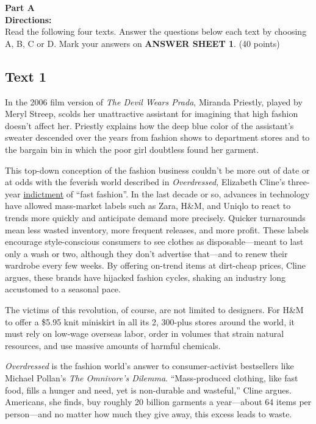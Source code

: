 \noindent
\textbf{Part A}\\
\textbf{Directions:}\\
Read the following four texts. Answer the questions below each
	text by choosing A, B, C or
	D. Mark your answers on \textbf{ANSWER SHEET 1}. (40
	points)

\newpage
\subsection{Text 1}


In the 2006 film version of \emph{The Devil Wears Prada}, Miranda
Priestly, played by Meryl Streep, scolds her unattractive assistant for
imagining that high fashion doesn't affect her. Priestly explains how
the deep blue color of the assistant's sweater descended over the years
from fashion shows to department stores and to the bargain bin in which
the poor girl doubtless found her garment.

This top-down conception of the fashion business couldn't be more out of
date or at odds with the feverish world described
in \emph{Overdressed,} Elizabeth Cline's
three-year \uline{indictment} of ``fast fashion''. In the last
decade or so, advances in technology have allowed mass-market labels
such as Zara, H\&M, and Uniqlo to react to trends more quickly and
anticipate demand more precisely. Quicker turnarounds mean less wasted
inventory, more frequent releases, and more profit. These labels
encourage style-conscious consumers to see clothes as disposable---meant
to last only a wash or two, although they don't advertise that---and to
renew their wardrobe every few weeks. By offering on-trend items at
dirt-cheap prices, Cline argues, these brands have hijacked fashion
cycles, shaking an industry long accustomed to a seasonal pace.

The victims of this revolution, of course, are not limited to designers.
For H\&M to offer a \$5.95 knit miniskirt in all its 2, 300-plus stores
around the world, it must rely on low-wage overseas labor, order in
volumes that strain natural resources, and use massive amounts of
harmful chemicals.

\emph{Overdressed} is the fashion world's answer to consumer-activist
bestsellers like Michael Pollan's \emph{The Omnivore's Dilemma}.
``Mass-produced clothing, like fast food, fills a hunger and need, yet
is non-durable and wasteful,'' Cline argues. Americans, she finds, buy
roughly 20 billion garments a year---about 64 items per person---and no
matter how much they give away, this excess leads to waste.

